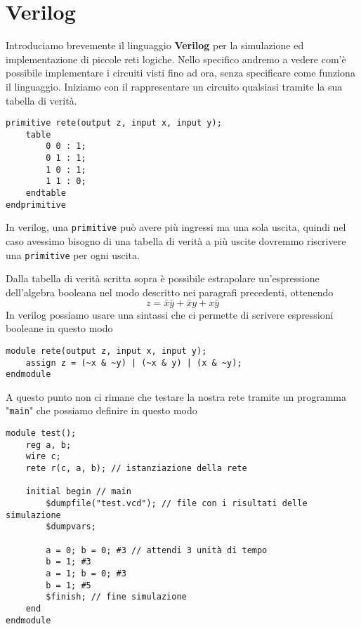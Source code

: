 \section{Verilog}
Introduciamo brevemente il linguaggio \textbf{Verilog} per la simulazione ed implementazione di
piccole reti logiche. Nello specifico andremo a vedere com'è possibile implementare i circuiti
visti fino ad ora, senza specificare come funziona il linguaggio. Iniziamo con il rappresentare un
circuito qualsiasi tramite la sua tabella di verità.
\begin{verbatim}
primitive rete(output z, input x, input y);
	table
		0 0 : 1;
		0 1 : 1;
		1 0 : 1;
		1 1 : 0;
	endtable
endprimitive
\end{verbatim}
In verilog, una \verb|primitive| può avere più ingressi ma una sola uscita, quindi nel caso
avessimo bisogno di una tabella di verità a più uscite dovremmo riscrivere una \verb|primitive| per
ogni uscita.

Dalla tabella di verità scritta sopra è possibile estrapolare un'espressione dell'algebra booleana
nel modo descritto nei paragrafi precedenti, ottenendo
\[ z = \bar{x} \bar{y} + \bar{x} y + x \bar{y} \]
In verilog possiamo usare una sintassi che ci permette di scrivere espressioni booleane in questo
modo
\begin{verbatim}
module rete(output z, input x, input y);
	assign z = (~x & ~y) | (~x & y) | (x & ~y);
endmodule
\end{verbatim}
A questo punto non ci rimane che testare la nostra rete tramite un programma "\verb|main|" che
possiamo definire in questo modo
\begin{verbatim}
module test();
	reg a, b;
	wire c;
	rete r(c, a, b); // istanziazione della rete 
	
	initial begin // main
		$dumpfile("test.vcd"); // file con i risultati delle simulazione
		$dumpvars;

		a = 0; b = 0; #3 // attendi 3 unità di tempo
		b = 1; #3
		a = 1; b = 0; #3
		b = 1; #5
		$finish; // fine simulazione
	end
endmodule
\end{verbatim}